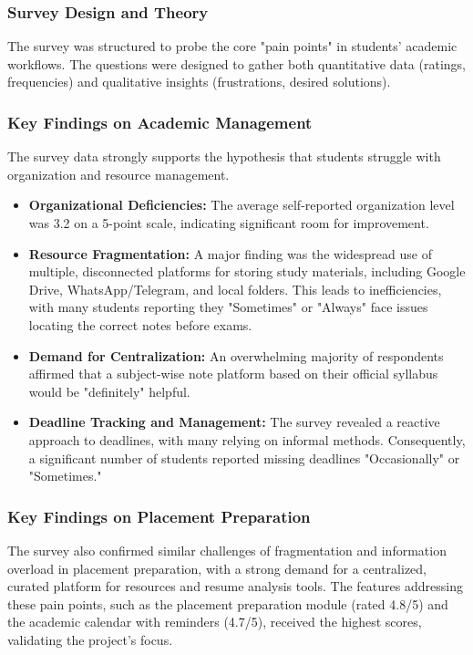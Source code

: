 \documentclass[12pt]{article}
\begin{document}
\subsubsection{Survey Design and Theory}
The survey was structured to probe the core "pain points" in students' academic workflows. The questions were designed to gather both quantitative data (ratings, frequencies) and qualitative insights (frustrations, desired solutions).

\subsubsection{Key Findings on Academic Management}
The survey data strongly supports the hypothesis that students struggle with organization and resource management.
\begin{itemize}
    \item \textbf{Organizational Deficiencies:} The average self-reported organization level was 3.2 on a 5-point scale, indicating significant room for improvement.
    \item \textbf{Resource Fragmentation:} A major finding was the widespread use of multiple, disconnected platforms for storing study materials, including Google Drive, WhatsApp/Telegram, and local folders. This leads to inefficiencies, with many students reporting they "Sometimes" or "Always" face issues locating the correct notes before exams.
    \item \textbf{Demand for Centralization:} An overwhelming majority of respondents affirmed that a subject-wise note platform based on their official syllabus would be "definitely" helpful.
    \item \textbf{Deadline Tracking and Management:} The survey revealed a reactive approach to deadlines, with many relying on informal methods. Consequently, a significant number of students reported missing deadlines "Occasionally" or "Sometimes."
\end{itemize}

\subsubsection{Key Findings on Placement Preparation}
The survey also confirmed similar challenges of fragmentation and information overload in placement preparation, with a strong demand for a centralized, curated platform for resources and resume analysis tools. The features addressing these pain points, such as the placement preparation module (rated 4.8/5) and the academic calendar with reminders (4.7/5), received the highest scores, validating the project's focus.
\end{document}

